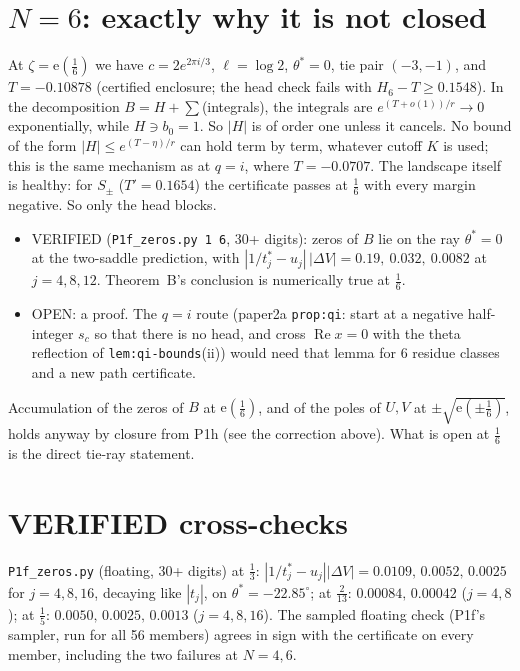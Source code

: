 \documentclass[11pt]{article}
\theoremstyle{remark}\newtheorem{remark}[theorem]{Remark}
\newcommand{\e}{\mathrm{e}}
\begin{document}
\section{$N=6$: exactly why it is not closed}\label{sec:six}
At $\zeta=\e(\frac16)$ we have $c=2e^{2\pi i/3}$, $\ell=\log2$, $\theta^*=0$, tie pair $(-3,-1)$, and $T=-0.10878$ (certified enclosure; the head check fails with $H_6-T\ge0.1548$).
In the decomposition $B=H+\sum$(integrals), the integrals are $e^{(T+o(1))/r}\to0$ exponentially, while $H\ni b_0=1$. So $|H|$ is of order one unless it cancels. No bound of the form $|H|\le e^{(T-\eta)/r}$ can hold term by term, whatever cutoff $K$ is used; this is the same mechanism as at $q=i$, where $T=-0.0707$.
The landscape itself is healthy: for $S_\pm$ ($T'=0.1654$) the certificate passes at $\frac16$ with every margin negative. So only the head blocks.
\begin{itemize}
\item VERIFIED (\texttt{P1f\_zeros.py 1 6}, 30+ digits): zeros of $B$ lie on the ray $\theta^*=0$ at the two-saddle prediction, with $|1/t^*_j-u_j|\,|\Delta V|=0.19,\ 0.032,\ 0.0082$ at $j=4,8,12$. Theorem~B's conclusion is numerically true at $\frac16$.
\item OPEN: a proof. The $q=i$ route (paper2a \texttt{prop:qi}: start at a negative half-integer $s_c$ so that there is no head, and cross $\operatorname{Re}x=0$ with the theta reflection of \texttt{lem:qi-bounds}(ii)) would need that lemma for 6 residue classes and a new path certificate.
\end{itemize}
Accumulation of the zeros of $B$ at $\e(\frac16)$, and of the poles of $U,V$ at $\pm\sqrt{\e(\pm\frac16)}$, holds anyway by closure from P1h (see the correction above). What is open at $\frac16$ is the direct tie-ray statement.

\section{VERIFIED cross-checks}
\texttt{P1f\_zeros.py} (floating, 30+ digits) at $\frac13$: $|1/t^*_j-u_j||\Delta V|=0.0109,\,0.0052,\,0.0025$ for $j=4,8,16$, decaying like $|t_j|$, on $\theta^*=-22.85^\circ$; at $\frac2{13}$: $0.00084,\,0.00042$ ($j=4,8$); at $\frac15$: $0.0050,\,0.0025,\,0.0013$ ($j=4,8,16$). The sampled floating check (P1f's sampler, run for all 56 members) agrees in sign with the certificate on every member, including the two failures at $N=4,6$.
\end{document}

